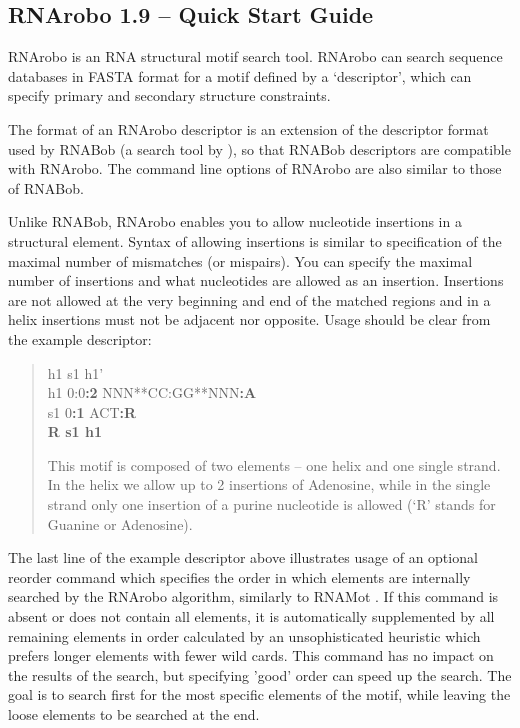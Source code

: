 \documentclass[11pt]{article}
\begin{document}


\begin{center} \section*{RNArobo 1.9 -- Quick Start Guide} \end{center}

RNArobo is an RNA structural motif search tool. RNArobo can search sequence databases in FASTA format for a motif defined by a `descriptor', which can specify primary and secondary structure constraints.

The format of an RNArobo descriptor is an extension of the descriptor format used by RNABob (a search tool by \citet{eddy1996}), so that RNABob descriptors are compatible with RNArobo. The command line options of RNArobo are also similar to those of RNABob.

Unlike RNABob, RNArobo enables you to allow nucleotide insertions in a structural element. Syntax of allowing insertions is similar to specification of the maximal number of mismatches (or mispairs). You can specify the maximal number of insertions and what nucleotides are allowed as an insertion. Insertions are not allowed at the very beginning and end of the matched regions and in a helix insertions must not be adjacent nor opposite. Usage should be clear from the example descriptor:

\begin{quote}
h1 s1 h1'\\
h1 0:0\textbf{:2} NNN**CC:GG**NNN\textbf{:A}\\
s1 0\textbf{:1} ACT\textbf{:R} \\
\textbf{R s1 h1}

This motif is composed of two elements -- one helix and one single strand. In the helix we allow up to 2 insertions of Adenosine, while in the single strand only one insertion of a purine nucleotide is allowed (`R' stands for Guanine or Adenosine).
\end{quote}

The last line of the example descriptor above illustrates usage of an optional reorder command which specifies the order in
which elements are internally searched by the RNArobo algorithm, similarly to RNAMot \citep{gautheret1990}. If this command is absent or does not contain all elements,
it is automatically supplemented by all remaining elements in order calculated by an unsophisticated heuristic which prefers longer elements with fewer wild cards. This command has no impact on the results of the search, but specifying 'good' order can speed up the search. The goal is to search first for the most specific elements of the motif, while leaving the loose elements to be searched at the end.  
\end{document}
